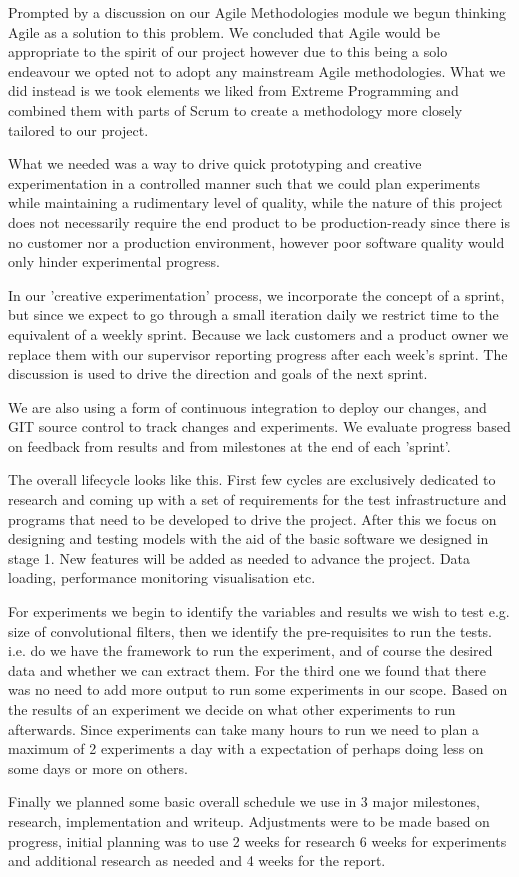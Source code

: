 Prompted by a discussion on our Agile Methodologies module we begun thinking Agile as a solution to this problem. We concluded that Agile would be appropriate to the spirit of our project however due to this being a solo endeavour we opted not to adopt any mainstream Agile methodologies. What we did instead is we took elements we liked from Extreme Programming and combined them with parts of Scrum to create a methodology more closely tailored to our project.

What we needed was a way to drive quick prototyping and creative experimentation in a controlled manner such that we could plan experiments while maintaining a rudimentary level of quality, while the nature of this project does not necessarily require the end product to be production-ready since there is no customer nor a production environment, however poor software quality would only hinder experimental progress.

In our 'creative experimentation' process, we incorporate the concept of a sprint, but since we expect to go through a small iteration daily we restrict time to the equivalent of a weekly sprint. Because we lack customers and a product owner we replace them with our supervisor reporting progress after each week's sprint. The discussion is used to drive the direction and goals of the next sprint.

We are also using a form of continuous integration to deploy our changes, and GIT source control to track changes and experiments. We evaluate progress based on feedback from results and from milestones at the end of each 'sprint'.

The overall lifecycle looks like this. First few cycles are exclusively dedicated to research and coming up with a set of requirements for the test infrastructure and programs that need to be developed to drive the project. After this we focus on designing and testing models with the aid of the basic software we designed in stage 1. New features will be added as needed to advance the project. Data loading, performance monitoring visualisation etc.

For experiments we begin to identify the variables and results we wish to test e.g. size of convolutional filters, then we identify the pre-requisites to run the tests. i.e. do we have the framework to run the experiment, and of course the desired data and whether we can extract them. For the third one we found that there was no need to add more output to run some experiments in our scope. Based on the results of an experiment we decide on what other experiments to run afterwards. Since experiments can take many hours to run we need to plan a maximum of 2 experiments a day with a expectation of perhaps doing less on some days or more on others.

Finally we planned some basic overall schedule we use in 3 major milestones, research, implementation and writeup. Adjustments were to be made based on progress, initial planning was to use 2 weeks for research 6 weeks for experiments and additional research as needed and 4 weeks for the report.